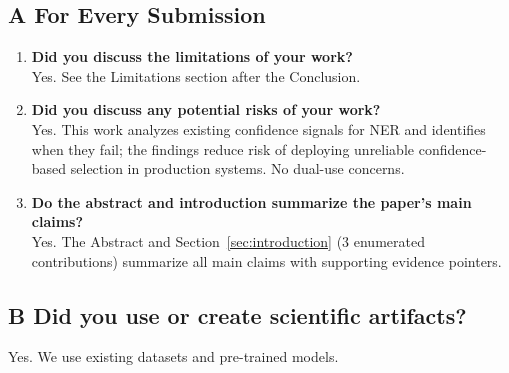 
\subsection*{A\hspace{0.5em} For Every Submission}

\begin{enumerate}
\item[A1.] \textbf{Did you discuss the limitations of your work?}\\
Yes. See the Limitations section after the Conclusion.

\item[A2.] \textbf{Did you discuss any potential risks of your work?}\\
Yes. This work analyzes existing confidence signals for NER and identifies when they fail; the findings reduce risk of deploying unreliable confidence-based selection in production systems. No dual-use concerns.

\item[A3.] \textbf{Do the abstract and introduction summarize the paper's main claims?}\\
Yes. The Abstract and Section~\ref{sec:introduction} (3 enumerated contributions) summarize all main claims with supporting evidence pointers.
\end{enumerate}

\subsection*{B\hspace{0.5em} Did you use or create scientific artifacts?}

Yes. We use existing datasets and pre-trained models.

